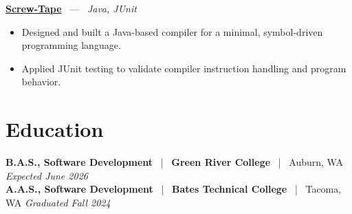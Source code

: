\documentclass[10pt, letterpaper]{article}
\newcommand{\jobhead}[4]{%
  \vspace{5pt}%
  {\bfseries\color{dark}#1}%
  ~{\color{light}|}~%
  {\bfseries\color{navy}#2}%
  ~{\color{light}|}~%
  {\color{light}#3}%
  \hfill{\color{light}\small\textit{#4}}\\[-2pt]%
}
\newcommand{\projhead}[3]{%
  \vspace{5pt}%
  {\bfseries\color{dark}\href{#2}{#1}}%
  ~{\color{light}---}~%
  {\color{light}\small\textit{#3}}\\[-2pt]%
}
\begin{document}
\projhead{Screw-Tape}{https://github.com/timmyd4/screwtape}{Java, JUnit}
\begin{itemize}
  \item Designed and built a Java-based compiler for a minimal, symbol-driven programming language.
  \item Applied JUnit testing to validate compiler instruction handling and program behavior.
\end{itemize}

\section{Education}

\jobhead{B.A.S., Software Development}{Green River College}{Auburn, WA}{Expected June 2026}
\jobhead{A.A.S., Software Development}{Bates Technical College}{Tacoma, WA}{Graduated Fall 2024}
\end{document}
